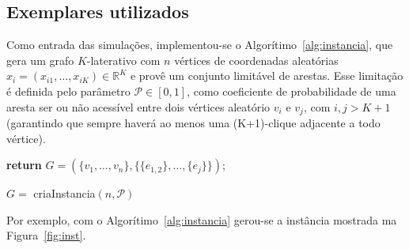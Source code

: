 \documentclass[a4paper,12pt]{article}
\begin{document}
	\subsection{Exemplares utilizados}
	Como entrada das simulações, implementou-se o Algorítimo~\ref{alg:instancia}, que gera um grafo $K$-laterativo com $n$ vértices de coordenadas aleatórias $x_i = (x_{i1},\dots,x_{iK})\in \mathbb{R}^K$ e provê um conjunto limitável de arestas. Esse limitação é definida pelo parâmetro $\mathcal{P} \in [0,1]$, como coeficiente de probabilidade de uma aresta ser ou não acessível entre dois vértices aleatório $v_i$ e $v_j$, com $i,j>K+1$ (garantindo que sempre haverá ao menos uma (K+1)-clique adjacente a todo vértice).
	\\
	
	\begin{algorithm}[H]
		\label{alg:instancia}
		\textbf{return} $G = (\{v_1,\dots,v_n\}, \{\{e_{1,2}\}, \dots,\{e_{j}\}\})$;
		\caption{$G =$ criaInstancia$(n, \mathcal{P})$}
	\end{algorithm}
	\vspace{0.4cm}
	
	Por exemplo, com o Algorítimo~\ref{alg:instancia} gerou-se a instância mostrada ma Figura~\ref{fig:inst}.
	
\end{document}
